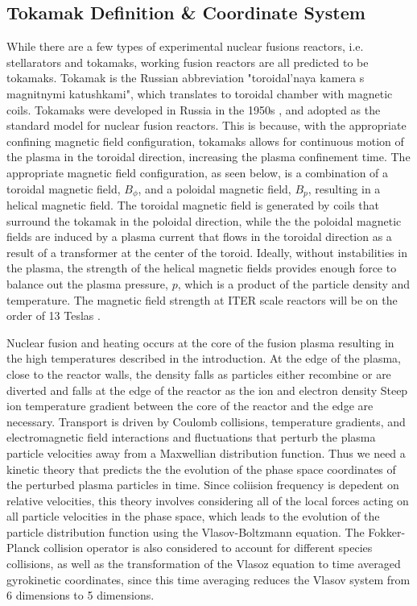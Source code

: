 \documentclass{article}
\begin{document}
\subsection{Tokamak Definition \& Coordinate System}


While there are a few types of experimental nuclear fusions reactors, i.e. stellarators and tokamaks, working fusion reactors are all predicted to be tokamaks. Tokamak is the Russian abbreviation "toroidal'naya kamera s magnitnymi katushkami", which translates to toroidal chamber with magnetic coils. Tokamaks were developed in Russia in the 1950s \cite{Wesson}, and adopted as the standard model for nuclear fusion reactors. This is because, with the appropriate confining magnetic field configuration, tokamaks allows for continuous motion of the plasma in the toroidal direction, increasing the plasma confinement time. The appropriate magnetic field configuration, as seen below, is a combination of a toroidal magnetic field, $B_{\phi}$, and a poloidal magnetic field, $B_p$, resulting in a helical magnetic field. The toroidal magnetic field is generated by coils that surround the tokamak in the poloidal direction, while the the poloidal magnetic fields are induced by a plasma current that flows in the toroidal direction as a result of a transformer at the center of the toroid. Ideally, without instabilities in the plasma, the strength of the helical magnetic fields provides enough force to balance out the plasma pressure, $p$, which is a product of the particle density and temperature. The magnetic field strength at ITER scale reactors will be on the order of 13 Teslas \cite{ITER}. 


Nuclear fusion and heating occurs at the core of the fusion plasma resulting in the high temperatures described in the introduction. At the edge of the plasma, close to the reactor walls, the density falls as particles either recombine or are diverted and falls at the edge of the reactor as the ion and electron density Steep ion temperature gradient between the core of the reactor and the edge are necessary. Transport is driven by Coulomb collisions, temperature gradients,  and  electromagnetic field interactions and fluctuations that perturb the plasma particle velocities away from a Maxwellian distribution function. Thus we need a kinetic theory that predicts the the evolution of the phase space coordinates of the perturbed plasma particles in time. Since coliision frequency is depedent on relative velocities, this theory involves considering all of the local forces acting on all particle velocities in the phase space, which leads to the evolution of the particle distribution function using the Vlasov-Boltzmann equation. The Fokker-Planck collision operator is also considered to account for different species collisions, as well as the transformation of the Vlasoz equation to time averaged gyrokinetic coordinates, since this time averaging reduces the Vlasov system from 6 dimensions to 5 dimensions.
\end{document}
